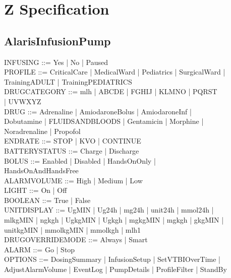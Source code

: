 \section{Z Specification}\label{ZSpecification2}

\subsection*{AlarisInfusionPump}
\begin{zed}
	INFUSING ::= Yes | No | Paused\\
	PROFILE ::= CriticalCare | MedicalWard | Pediatrics | SurgicalWard | \\
	TrainingADULT | TrainingPEDIATRICS\\
	DRUGCATEGORY ::= mlh | ABCDE | FGHIJ | KLMNO | PQRST\\
	 | UVWXYZ\\
	DRUG ::= Adrenaline | AmiodaroneBolus | AmiodaroneInf |\\
	Dobutamine | FLUIDSANDBLOODS | Gentamicin | Morphine | \\
	Noradrenaline | Propofol\\
	ENDRATE ::= STOP | KVO | CONTINUE\\
	BATTERYSTATUS ::= Charge | Discharge\\
	BOLUS ::= Enabled | Disabled | HandsOnOnly | \\
	HandsOnAndHandsFree\\
	ALARMVOLUME ::= High | Medium | Low\\
	LIGHT ::= On | Off\\
	BOOLEAN ::= True | False\\
	UNITDISPLAY ::= UgMIN | Ug24h | mg24h | unit24h | mmol24h | \\
	mlkgMIN | ngkgh | UgkgMIN | Ugkgh | mgkgMIN | mgkgh | gkgMIN | \\
	unitkgMIN | mmolkgMIN | mmolkgh | mlh1\\
	DRUGOVERRIDEMODE ::= Always | Smart\\
	ALARM ::= Go | Stop\\
	OPTIONS ::= DosingSummary | InfusionSetup | SetVTBIOverTime | \\
	AdjustAlarmVolume | EventLog | PumpDetails | ProfileFilter | StandBy\\
\end{zed}
\vfill

